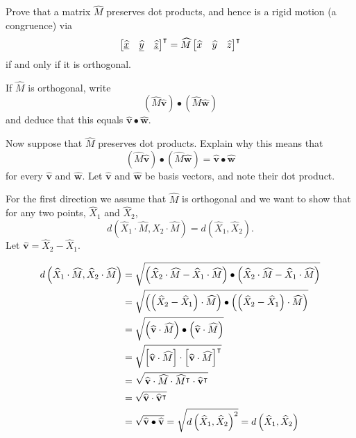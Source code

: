 \documentclass[newpage,hints,handout,12pt,noauthor,nooutcomes]{ximera}
\begin{document}
\begin{problem}
  Prove that a matrix $\hat{M}$ preserves dot products, and hence is a
  rigid motion (a congruence) via
  \[
  \begin{bmatrix}
    \underline{\hat{x}} & \underline{\hat{y}} & \underline{\hat{z}}%
  \end{bmatrix}^\transpose
  =\hat M \begin{bmatrix} \hat{x} & \hat{y} & \hat{z}\end{bmatrix}^\transpose
  \]
  if and only if it is orthogonal.
  \begin{hint}
    If $\hat{M}$ is orthogonal, write
    \[
    (\hat M\hat{\mathbf v}) \bullet (\hat M\hat{\mathbf w})
    \]
    and deduce that this equals $\hat{\mathbf v}\bullet\hat{\mathbf w}$. 
  \end{hint}
  \begin{hint}
    Now suppose that $\hat{M}$ preserves dot products. Explain why this means
    that
    \[
    (\hat{M}\hat{\mathbf v}) \bullet (\hat M\hat{\mathbf w})=
    \hat{\mathbf v} \bullet \hat{\mathbf w}
    \]
    for every $\hat{\mathbf v}$ and $\hat{\mathbf w}$. Let
    $\hat{\mathbf v}$ and $\hat{\mathbf w}$ be basis vectors, and note
    their dot product.
  \end{hint}
  
  
\begin{freeResponse}
For the first direction we assume that $\hat{M}$ is orthogonal and we want to show that for any two points,  $\hat{X}_{1}$ and $\hat{X}_{2}$,%
\[
   d\left( \hat{X}_{1}  \cdot\hat{M},\hat{X}_{2}
   \cdot\hat{M}\right)  =d\left(  \hat{X}_{1},\hat{X}_{2}\right).
\]
Let $ \hat{\mathbf v}=\hat{X}_{2}-\hat{X}_{1}$.

\begin{align*}
   d\left( \widehat{X}_{1}  \cdot\widehat{M},\widehat{X}_{2}
   \cdot\widehat{M}\right) &= \sqrt{\left(\widehat{X}_{2}  \cdot\widehat{M}-\widehat{X}_{1}  \cdot\widehat{M}\right) \bullet \left(\widehat{X}_{2}  	\cdot\widehat{M}-\widehat{X}_{1}  \cdot\widehat{M}\right)} \\
   & = \sqrt{\left( \left( \widehat{X}_{2}-\widehat{X}_{1} \right) \cdot\widehat{M}\right) \bullet \left( \left( \widehat{X}_{2}-\widehat{X}_{1} 		\right) \cdot\widehat{M}\right)} \\
   & = \sqrt{ \left(\widehat{\mathbf v}\cdot\widehat{M} \right) \bullet \left(\widehat{\mathbf v}\cdot\widehat{M} \right)}\\
   & = \sqrt{
       \begin{bmatrix}
          \widehat{\mathbf v}\cdot\widehat{M}
       \end{bmatrix} \cdot
       \begin{bmatrix}
          \widehat{\mathbf v}\cdot\widehat{M}
       \end{bmatrix}^\intercal}\\
   & = \sqrt{ \widehat{\mathbf v}\cdot\widehat{M} \cdot \widehat{M}^\intercal \cdot \widehat{\mathbf v}^\intercal} \\
   & = \sqrt{ \widehat{\mathbf v} \cdot \widehat{\mathbf v}^\intercal} \\
   & = \sqrt{\widehat{\mathbf v} \bullet \widehat{\mathbf v}} = \sqrt{d\left(  \widehat{X}_{1},\widehat{X}_{2}\right)^2} = d\left( \widehat{X}_{1},\widehat{X}_{2}\right)
\end{align*}


\end{freeResponse}
\end{problem}
\end{document}

